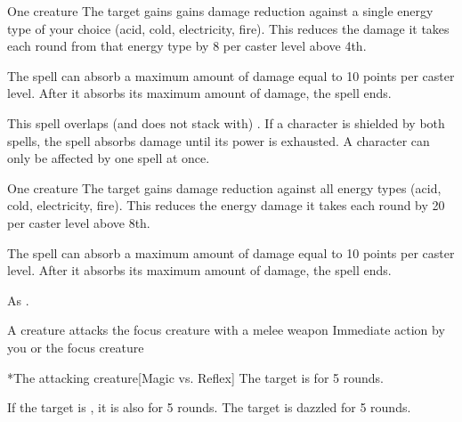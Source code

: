 \begin{spelltarget}{One creature}
    \spelleffect The target gains gains damage reduction against a single energy type of your choice (acid, cold, electricity, fire). This reduces the damage it takes each round from that energy type by 8  per caster level above 4th.
    \par The spell can absorb a maximum amount of damage equal to 10 points per caster level. After it absorbs its maximum amount of damage, the spell ends.
\end{spelltarget}
\spellnotes This spell overlaps (and does not stack with) . If a character is shielded by both spells, the  spell absorbs damage until its power is exhausted. A character can only be affected by one  spell at once.

\begin{spelltarget}{One creature}
    \spelleffect The target gains damage reduction against all energy types (acid, cold, electricity, fire). This reduces the energy damage it takes each round by 20  per caster level above 8th.
    \par The spell can absorb a maximum amount of damage equal to 10 points per caster level. After it absorbs its maximum amount of damage, the spell ends.
\end{spelltarget}
\spellnotes As .

\spellrng{\rngclose}
\begin{spelltrigger}{A creature attacks the focus creature with a melee weapon}
     Immediate action by you or the focus creature
    \spellrng{\rngclose}
    \begin{spelltarget}*{The attacking creature}[Magic vs. Reflex]
        \spellsuccess The target is \dazzled for 5 rounds.

        If the target is \bloodied, it is also \blinded for 5 rounds.
        \spellfailure The target is dazzled for 5 rounds.
    \end{spelltarget}
\end{spelltrigger}

